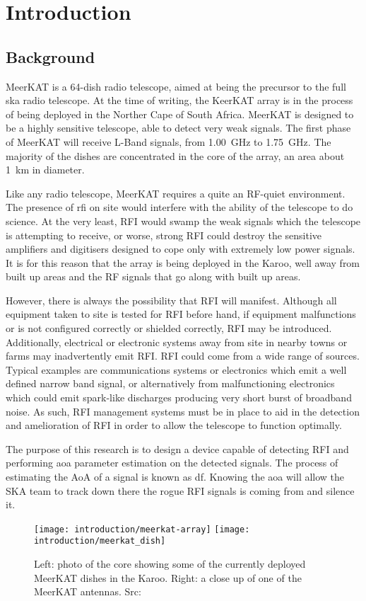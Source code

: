 \chapter{Introduction}
\label{ch:introduction}
\section{Background}
MeerKAT is a 64-dish radio telescope, aimed at being the precursor to the full \gls{ska} radio telescope. At the time of writing, the KeerKAT array is in the process of being deployed in the Norther Cape of South Africa.
MeerKAT is designed to be a highly sensitive telescope, able to detect very weak signals. The first phase of MeerKAT will receive L-Band signals, from \SI{1.00}{\giga\hertz} to \SI{1.75}{\giga\hertz}. The majority of the dishes are concentrated in the core of the array, an area about \SI{1}{\kilo\meter} in diameter.

Like any radio telescope, MeerKAT requires a quite an RF-quiet environment.
The presence of \gls{rfi} on site would interfere with the ability of the telescope to do science. At the very least, RFI would swamp the weak signals which the telescope is attempting to receive, or  worse, strong RFI could destroy the sensitive amplifiers and digitisers designed to cope only with extremely low power signals.
It is for this reason that the array is being deployed in the Karoo, well away from built up areas and the RF signals that go along with built up areas. 

However, there is always the possibility that RFI will manifest. 
Although all equipment taken to site is tested for RFI before hand, if equipment malfunctions or is not configured correctly or shielded correctly, RFI may be introduced. Additionally, electrical or electronic systems away from site in nearby towns or farms may inadvertently emit RFI. RFI could come from a wide range of sources. Typical examples are communications systems or electronics which emit a well defined narrow band signal, or alternatively from malfunctioning electronics which could emit spark-like discharges producing very short burst of broadband noise.
As such, RFI management systems must be in place to aid in the detection and amelioration of RFI in order to allow the telescope to function optimally.

The purpose of this research is to design a device capable of detecting RFI and performing \gls{aoa} parameter estimation on the detected signals.
The process of estimating the AoA of a signal is known as \gls{df}.
Knowing the \gls{aoa} will allow the SKA team to track down there the rogue RFI signals is coming from and silence it.

\begin{figure}[hb]
  \centering
  \texttt{[image: introduction/meerkat-array]}
  \texttt{[image: introduction/meerkat\_dish]}
  \caption{Left: photo of the core showing some of the currently deployed MeerKAT dishes in the Karoo. Right: a close up of one of the MeerKAT antennas. Src: \cite{skasawebsite}}
\end{figure}



